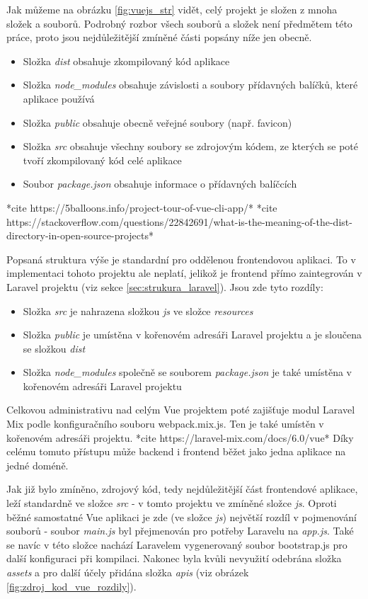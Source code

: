 	Jak můžeme na obrázku \ref{fig:vuejs_str} vidět, celý projekt je složen z mnoha složek a souborů. Podrobný rozbor všech souborů a složek není předmětem této práce, proto jsou nejdůležitější zmíněné části popsány níže jen obecně.
	
	\begin{itemize}
		\item Složka \textit{dist} obsahuje zkompilovaný kód aplikace
		\item Složka \textit{node\_modules} obsahuje závislosti a soubory přídavných balíčků, které aplikace používá
		\item Složka \textit{public} obsahuje obecně veřejné soubory (např. favicon)
		\item Složka \textit{src} obsahuje všechny soubory se zdrojovým kódem, ze kterých se poté tvoří zkompilovaný kód celé aplikace
		\item Soubor \textit{package.json} obsahuje informace o přídavných balíčcích
	\end{itemize}

	*cite https://5balloons.info/project-tour-of-vue-cli-app/*
	*cite https://stackoverflow.com/questions/22842691/what-is-the-meaning-of-the-dist-directory-in-open-source-projects*
	
	Popsaná struktura výše je standardní pro oddělenou frontendovou aplikaci. To v implementaci tohoto projektu ale neplatí, jelikož je frontend přímo zaintegrován v Laravel projektu (viz sekce \ref{sec:strukura_laravel}). Jsou zde tyto rozdíly:
	
	\begin{itemize}
		\item Složka \textit{src} je nahrazena složkou \textit{js} ve složce \textit{resources}
		\item Složka \textit{public} je umístěna v kořenovém adresáři Laravel projektu a je sloučena se složkou \textit{dist}
		\item Složka \textit{node\_modules} společně se souborem \textit{package.json} je také umístěna v kořenovém adresáři Laravel projektu
	\end{itemize}
	
	Celkovou administrativu nad celým Vue projektem poté zajišťuje modul Laravel Mix podle konfiguračního souboru webpack.mix.js. Ten je také umístěn v kořenovém adresáři projektu. *cite https://laravel-mix.com/docs/6.0/vue* Díky celému tomuto přístupu může backend i frontend běžet jako jedna aplikace na jedné doméně.
	
	Jak již bylo zmíněno, zdrojový kód, tedy nejdůležitější část frontendové aplikace, leží standardně ve složce \textit{src} - v tomto projektu ve zmíněné složce \textit{js}. Oproti běžné samostatné Vue aplikaci je zde (ve složce \textit{js}) největší rozdíl v pojmenování souborů - soubor \textit{main.js} byl přejmenován pro potřeby Laravelu na \textit{app.js}. Také se navíc v této složce nachází Laravelem vygenerovaný soubor bootstrap.js pro další konfiguraci při kompilaci. Nakonec byla kvůli nevyužití odebrána složka \textit{assets} a pro další účely přidána složka \textit{apis} (viz obrázek \ref{fig:zdroj_kod_vue_rozdily}).
	
